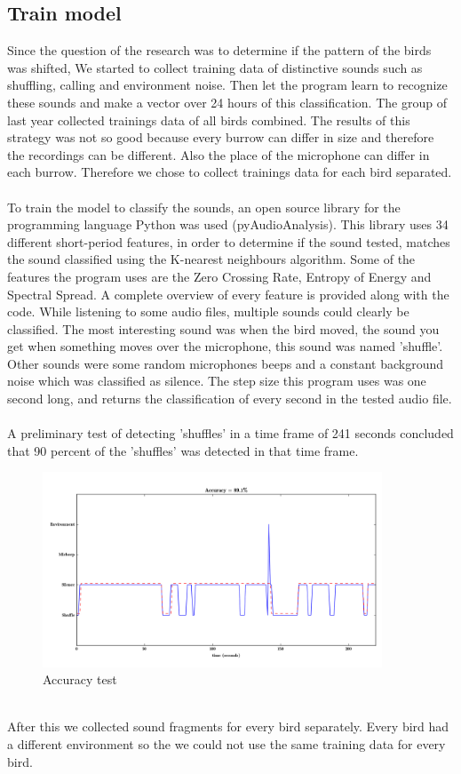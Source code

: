 \documentclass[a4paper]{article}
\begin{document}
\subsection*{Train model }

Since the question of the research was to determine if the pattern of the birds was shifted, We started to collect training data of distinctive sounds such as shuffling, calling and environment noise. Then let the program learn to recognize these sounds and make a vector over 24 hours of this classification. The group of last year collected trainings data of all birds combined. The results of this strategy was not so good because every burrow can differ in size and therefore the recordings can be different. Also the place of the microphone can differ in each burrow. Therefore we chose to collect trainings data for each bird separated.\\\\
To train the model to classify the sounds, an open source library for the programming language Python was used (pyAudioAnalysis). This library  uses 34 different short-period features, in order to determine if the sound tested, matches the sound classified using the K-nearest neighbours algorithm. Some of the features the program uses are the Zero Crossing Rate, Entropy of Energy and Spectral Spread. A complete overview of every feature is provided along with the code. While listening to some audio files, multiple sounds could clearly be classified. The most interesting sound was when the bird moved, the sound you get when something moves over the microphone, this sound was named 'shuffle'. Other sounds were some random microphones beeps and a constant background noise which was classified as silence. The step size this program uses was one second long, and returns the classification of every second in the tested audio file.
\\\\A preliminary test of detecting 'shuffles' in a time frame of 241 seconds concluded that 90 percent of the 'shuffles' was detected in that time frame. \\
\begin{figure}[!ht]
  \centering
    \includegraphics[width=0.9\textwidth]{accuracy_test_crop}
      \caption{Accuracy test}
\end{figure}
\\
After this we collected sound fragments for every bird separately. Every bird had a different environment so the we could not use the same training data for every bird.
\end{document}
